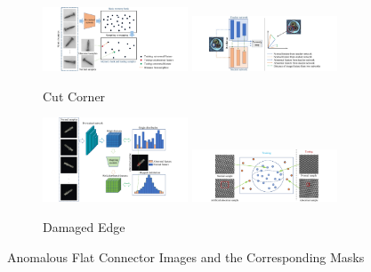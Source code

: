 

\begin{figure}[ht]
    \captionsetup[subfigure]{justification=centering}
    \centering
    \begin{subfigure}[b]{\textwidth}
        \centering
        \includegraphics[width=0.475\textwidth]{figures/approachvizgeneral/memorybankviz.jpg}
        \includegraphics[width=0.475\textwidth]{figures/approachvizgeneral/TSviz.jpg}
        \caption*{Cut Corner}

    \end{subfigure}
    \hfill
    \begin{subfigure}[b]{\textwidth}
        \centering
        \includegraphics[width=0.475\textwidth]{figures/approachvizgeneral/distmapviz.jpg}
        \includegraphics[width=0.475\textwidth]{figures/approachvizgeneral/OCCviz.jpg}
        \caption*{Damaged Edge}

    \end{subfigure}
    

    \caption{Anomalous Flat Connector Images and the Corresponding Masks}
    \label{fig:approachvizgeneral}
\end{figure}